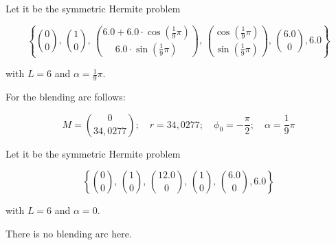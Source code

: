 \BEISPIEL
{
  Let it be the symmetric Hermite problem 
  
  $$\left\{\binom{0}{0},\, \binom{1}{0},\,
  \binom{6.0+6.0\cdot \cos\left(\frac{1}{9}\pi\right)}{6.0\cdot \sin\left(\frac{1}{9}\pi\right)},\, \binom{\cos\left(\frac{1}{9}\pi\right)}{\sin\left(\frac{1}{9}\pi\right)},\, \binom{6.0}{0},6.0\right\}$$
  
  with $L=6$ and $\alpha=\frac{1}{9}\pi$.
  
  For the blending arc follows:
  
  $$M=\binom{0}{34,0277}; \quad r=34,0277;\quad \phi_0 = -\frac{\pi}{2}; \quad \alpha=\frac{1}{9}\pi$$
  
  
  \begin{center}
  \end{center}
}


\BEISPIEL
{
  Let it be the symmetric Hermite problem 
  
  $$\left\{\binom{0}{0},\, \binom{1}{0},\,
  \binom{12.0}{0},\, \binom{1}{0},\, \binom{6.0}{0},6.0\right\}$$
  
  with $L=6$ and $\alpha=0$.
  
 There is no blending arc here.

  
  \begin{center}
  \end{center}
}



